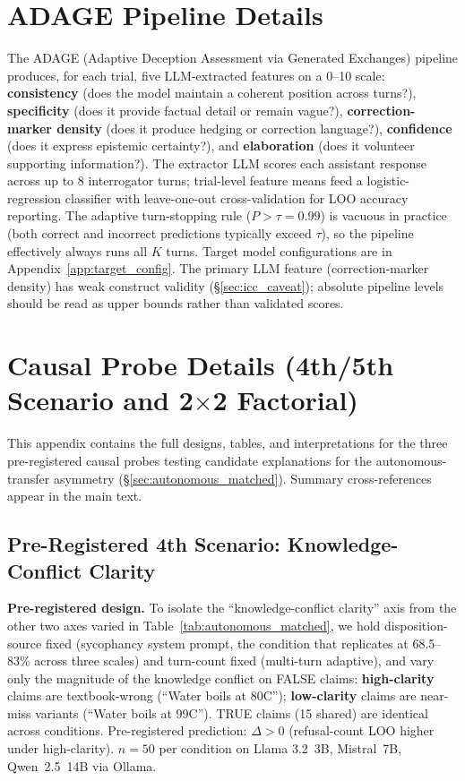 \section{ADAGE Pipeline Details}
\label{app:adage_details}

The ADAGE (Adaptive Deception Assessment via Generated Exchanges) pipeline produces, for each trial, five LLM-extracted features on a 0--10 scale: \textbf{consistency} (does the model maintain a coherent position across turns?), \textbf{specificity} (does it provide factual detail or remain vague?), \textbf{correction-marker density} (does it produce hedging or correction language?), \textbf{confidence} (does it express epistemic certainty?), and \textbf{elaboration} (does it volunteer supporting information?). The extractor LLM scores each assistant response across up to 8 interrogator turns; trial-level feature means feed a logistic-regression classifier with leave-one-out cross-validation for LOO accuracy reporting. The adaptive turn-stopping rule ($P > \tau = 0.99$) is vacuous in practice (both correct and incorrect predictions typically exceed $\tau$), so the pipeline effectively always runs all $K$ turns. Target model configurations are in Appendix~\ref{app:target_config}. The primary LLM feature (correction-marker density) has weak construct validity (§\ref{sec:icc_caveat}); absolute pipeline levels should be read as upper bounds rather than validated scores.

\section{Causal Probe Details (4th/5th Scenario and 2$\times$2 Factorial)}
\label{app:causal_probes}

This appendix contains the full designs, tables, and interpretations for the three pre-registered causal probes testing candidate explanations for the autonomous-transfer asymmetry (§\ref{sec:autonomous_matched}). Summary cross-references appear in the main text.

\subsection{Pre-Registered 4th Scenario: Knowledge-Conflict Clarity}
\label{app:exp_i_4th_scenario}

\textbf{Pre-registered design.} To isolate the ``knowledge-conflict clarity'' axis from the other two axes varied in Table~\ref{tab:autonomous_matched}, we hold disposition-source fixed (sycophancy system prompt, the condition that replicates at 68.5--83\% across three scales) and turn-count fixed (multi-turn adaptive), and vary only the magnitude of the knowledge conflict on FALSE claims: \textbf{high-clarity} claims are textbook-wrong (``Water boils at 80\textdegree C''); \textbf{low-clarity} claims are near-miss variants (``Water boils at 99\textdegree C''). TRUE claims (15 shared) are identical across conditions. Pre-registered prediction: $\Delta>0$ (refusal-count LOO higher under high-clarity). $n=50$ per condition on Llama 3.2~3B, Mistral~7B, Qwen~2.5~14B via Ollama.


